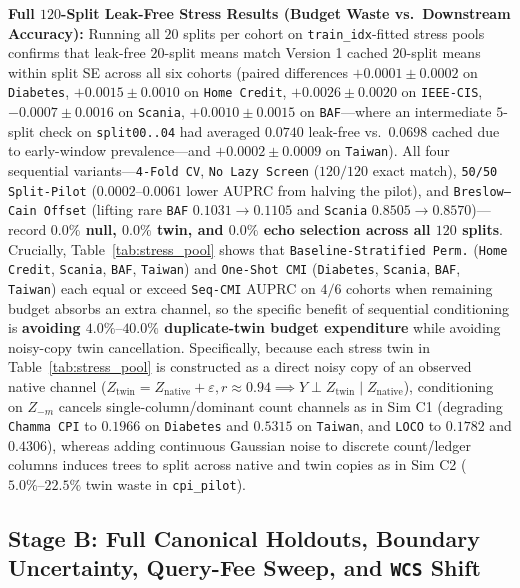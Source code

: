 \documentclass[11pt]{article}
\theoremstyle{remark}
\begin{document}
\textbf{Full $120$-Split Leak-Free Stress Results (Budget Waste vs.\ Downstream Accuracy):} Running all $20$ splits per cohort on \texttt{train\_idx}-fitted stress pools confirms that leak-free $20$-split means match Version 1 cached $20$-split means within split SE across all six cohorts (paired differences $+0.0001\pm 0.0002$ on \texttt{Diabetes}, $+0.0015\pm 0.0010$ on \texttt{Home Credit}, $+0.0026\pm 0.0020$ on \texttt{IEEE-CIS}, $-0.0007\pm 0.0016$ on \texttt{Scania}, $+0.0010\pm 0.0015$ on \texttt{BAF}---where an intermediate $5$-split check on \texttt{split00..04} had averaged $0.0740$ leak-free vs.\ $0.0698$ cached due to early-window prevalence---and $+0.0002\pm 0.0009$ on \texttt{Taiwan}). All four sequential variants---\texttt{4-Fold CV}, \texttt{No Lazy Screen} ($120/120$ exact match), \texttt{50/50 Split-Pilot} ($0.0002\text{--}0.0061$ lower AUPRC from halving the pilot), and \texttt{Breslow--Cain Offset} (lifting rare \texttt{BAF} $0.1031 \to 0.1105$ and \texttt{Scania} $0.8505 \to 0.8570$)---record \textbf{$0.0\%$ null, $0.0\%$ twin, and $0.0\%$ echo selection across all $120$ splits}. Crucially, Table~\ref{tab:stress_pool} shows that \texttt{Baseline-Stratified Perm.} (\texttt{Home Credit}, \texttt{Scania}, \texttt{BAF}, \texttt{Taiwan}) and \texttt{One-Shot CMI} (\texttt{Diabetes}, \texttt{Scania}, \texttt{BAF}, \texttt{Taiwan}) each equal or exceed \texttt{Seq-CMI} AUPRC on $4/6$ cohorts when remaining budget absorbs an extra channel, so the specific benefit of sequential conditioning is \textbf{avoiding $4.0\%\text{--}40.0\%$ duplicate-twin budget expenditure} while avoiding noisy-copy twin cancellation. Specifically, because each stress twin in Table~\ref{tab:stress_pool} is constructed as a direct noisy copy of an observed native channel ($Z_{\text{twin}} = Z_{\text{native}} + \varepsilon, r \approx 0.94 \implies Y \perp Z_{\text{twin}} \mid Z_{\text{native}}$), conditioning on $Z_{-m}$ cancels single-column/dominant count channels as in Sim C1 (degrading \texttt{Chamma CPI} to $0.1966$ on \texttt{Diabetes} and $0.5315$ on \texttt{Taiwan}, and \texttt{LOCO} to $0.1782$ and $0.4306$), whereas adding continuous Gaussian noise to discrete count/ledger columns induces trees to split across native and twin copies as in Sim C2 ($5.0\%\text{--}22.5\%$ twin waste in \texttt{cpi\_pilot}).

\subsection{Stage B: Full Canonical Holdouts, Boundary Uncertainty, Query-Fee Sweep, and \texttt{WCS} Shift}
\label{sec:res_streaming}
\end{document}
